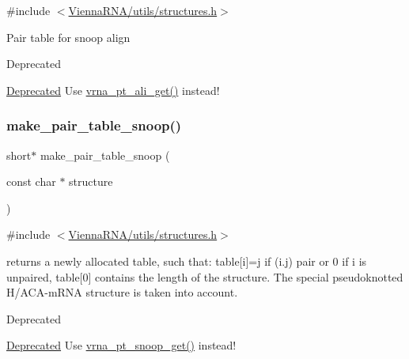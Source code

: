 {\ttfamily \#include $<$\hyperlink{utils_2structures_8h}{Vienna\+R\+N\+A/utils/structures.\+h}$>$}

Pair table for snoop align

\begin{DoxyRefDesc}{Deprecated}
\item[\hyperlink{deprecated__deprecated000187}{Deprecated}]Use \hyperlink{group__struct__utils__pair__table_ga1ee4cdcda1f57d32dcb38032116d335d}{vrna\+\_\+pt\+\_\+ali\+\_\+get()} instead!\end{DoxyRefDesc}
\mbox{\label{group__struct__utils__deprecated_ga9aa3bf3b4346bb7fb88efc154dd07a79}} 
\subsubsection{\texorpdfstring{make\+\_\+pair\+\_\+table\+\_\+snoop()}{make\_pair\_table\_snoop()}}
{\footnotesize\ttfamily short$\ast$ make\+\_\+pair\+\_\+table\+\_\+snoop (\begin{DoxyParamCaption}\item[{const char $\ast$}]{structure }\end{DoxyParamCaption})}



{\ttfamily \#include $<$\hyperlink{utils_2structures_8h}{Vienna\+R\+N\+A/utils/structures.\+h}$>$}

returns a newly allocated table, such that\+: table\mbox{[}i\mbox{]}=j if (i.\+j) pair or 0 if i is unpaired, table\mbox{[}0\mbox{]} contains the length of the structure. The special pseudoknotted H/\+A\+C\+A-\/m\+R\+NA structure is taken into account. \begin{DoxyRefDesc}{Deprecated}
\item[\hyperlink{deprecated__deprecated000188}{Deprecated}]Use \hyperlink{group__struct__utils__pair__table_gaef0f7e1a6c00c81a349973de53039dda}{vrna\+\_\+pt\+\_\+snoop\+\_\+get()} instead!\end{DoxyRefDesc}
\mbox{\label{group__struct__utils__deprecated_ga6ebbcd29a754f0e4f1a66d1fd84184db}} 
